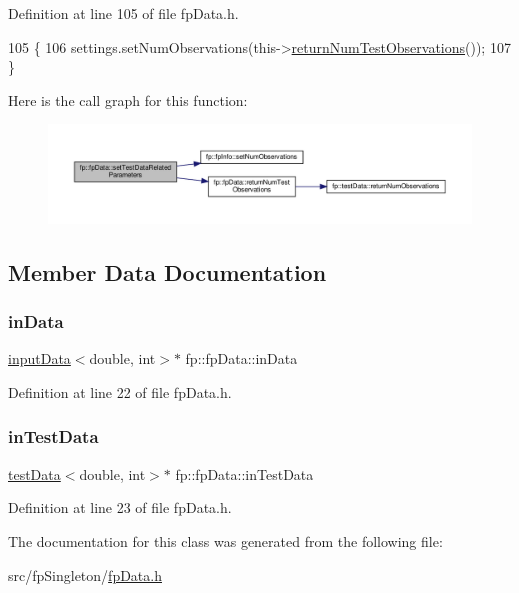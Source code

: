 Definition at line 105 of file fp\+Data.\+h.


\begin{DoxyCode}
105                                                                       \{
106                 settings.setNumObservations(this->\hyperlink{classfp_1_1fpData_a9a115d29fafb6e5b941f4e0c860e65e7}{returnNumTestObservations}());
107             \}
\end{DoxyCode}
Here is the call graph for this function\+:
\nopagebreak
\begin{figure}[H]
\begin{center}
\leavevmode
\includegraphics[width=350pt]{classfp_1_1fpData_ab60d2098334e253a0bf3115f029c1996_cgraph}
\end{center}
\end{figure}


\subsection{Member Data Documentation}
\mbox{\label{classfp_1_1fpData_a49d7c3f58bcf88843c25b1b0c9714ebe}} 
\subsubsection{\texorpdfstring{in\+Data}{inData}}
{\footnotesize\ttfamily \hyperlink{classfp_1_1inputData}{input\+Data}$<$double, int$>$$\ast$ fp\+::fp\+Data\+::in\+Data\hspace{0.3cm}{\ttfamily [protected]}}



Definition at line 22 of file fp\+Data.\+h.

\mbox{\label{classfp_1_1fpData_ad4f4dd3a8d15633b7f983932fa60bbad}} 
\subsubsection{\texorpdfstring{in\+Test\+Data}{inTestData}}
{\footnotesize\ttfamily \hyperlink{classfp_1_1testData}{test\+Data}$<$double, int$>$$\ast$ fp\+::fp\+Data\+::in\+Test\+Data\hspace{0.3cm}{\ttfamily [protected]}}



Definition at line 23 of file fp\+Data.\+h.



The documentation for this class was generated from the following file\+:\begin{DoxyCompactItemize}
\item 
src/fp\+Singleton/\hyperlink{fpData_8h}{fp\+Data.\+h}\end{DoxyCompactItemize}
